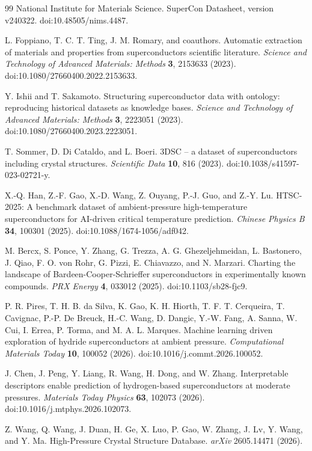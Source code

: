 \documentclass[11pt,a4paper]{article}
\begin{document}
\begin{thebibliography}{99}
National Institute for Materials Science.
SuperCon Datasheet, version v240322.
doi:10.48505/nims.4487.

L. Foppiano, T. C. T. Ting, J. M. Romary, and coauthors.
Automatic extraction of materials and properties from superconductors scientific literature.
\textit{Science and Technology of Advanced Materials: Methods} \textbf{3}, 2153633 (2023).
doi:10.1080/27660400.2022.2153633.

Y. Ishii and T. Sakamoto.
Structuring superconductor data with ontology: reproducing historical datasets as knowledge bases.
\textit{Science and Technology of Advanced Materials: Methods} \textbf{3}, 2223051 (2023).
doi:10.1080/27660400.2023.2223051.

T. Sommer, D. Di Cataldo, and L. Boeri.
3DSC -- a dataset of superconductors including crystal structures.
\textit{Scientific Data} \textbf{10}, 816 (2023).
doi:10.1038/s41597-023-02721-y.

X.-Q. Han, Z.-F. Gao, X.-D. Wang, Z. Ouyang, P.-J. Guo, and Z.-Y. Lu.
HTSC-2025: A benchmark dataset of ambient-pressure high-temperature superconductors for AI-driven critical temperature prediction.
\textit{Chinese Physics B} \textbf{34}, 100301 (2025).
doi:10.1088/1674-1056/adf042.

M. Bercx, S. Ponce, Y. Zhang, G. Trezza, A. G. Ghezeljehmeidan, L. Bastonero, J. Qiao, F. O. von Rohr, G. Pizzi, E. Chiavazzo, and N. Marzari.
Charting the landscape of Bardeen-Cooper-Schrieffer superconductors in experimentally known compounds.
\textit{PRX Energy} \textbf{4}, 033012 (2025).
doi:10.1103/sb28-fjc9.

P. R. Pires, T. H. B. da Silva, K. Gao, K. H. Hiorth, T. F. T. Cerqueira, T. Cavignac, P.-P. De Breuck, H.-C. Wang, D. Dangic, Y.-W. Fang, A. Sanna, W. Cui, I. Errea, P. Torma, and M. A. L. Marques.
Machine learning driven exploration of hydride superconductors at ambient pressure.
\textit{Computational Materials Today} \textbf{10}, 100052 (2026).
doi:10.1016/j.commt.2026.100052.

J. Chen, J. Peng, Y. Liang, R. Wang, H. Dong, and W. Zhang.
Interpretable descriptors enable prediction of hydrogen-based superconductors at moderate pressures.
\textit{Materials Today Physics} \textbf{63}, 102073 (2026).
doi:10.1016/j.mtphys.2026.102073.

Z. Wang, Q. Wang, J. Duan, H. Ge, X. Luo, P. Gao, W. Zhang, J. Lv, Y. Wang, and Y. Ma.
High-Pressure Crystal Structure Database.
\textit{arXiv} 2605.14471 (2026).

\end{thebibliography}
\end{document}
